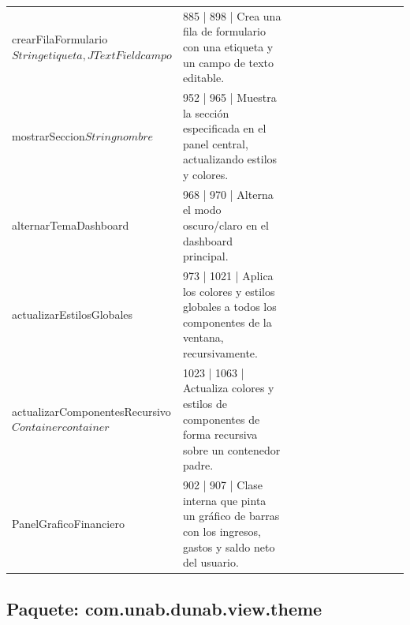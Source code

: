 \documentclass[utf8]{article}
\begin{document}
\begin{longtable}{p{0.18\linewidth}p{0.32\linewidth}p{0.5\linewidth}}
crearFilaFormulario\(String etiqueta, JTextField campo\) & 885 | 898 | Crea una fila de formulario con una etiqueta y un campo de texto editable. \\
mostrarSeccion\(String nombre\) & 952 | 965 | Muestra la sección especificada en el panel central, actualizando estilos y colores. \\
alternarTemaDashboard\(\) & 968 | 970 | Alterna el modo oscuro/claro en el dashboard principal. \\
actualizarEstilosGlobales\(\) & 973 | 1021 | Aplica los colores y estilos globales a todos los componentes de la ventana, recursivamente. \\
actualizarComponentesRecursivo\(Container container\) & 1023 | 1063 | Actualiza colores y estilos de componentes de forma recursiva sobre un contenedor padre. \\
PanelGraficoFinanciero\(\) & 902 | 907 | Clase interna que pinta un gráfico de barras con los ingresos, gastos y saldo neto del usuario. \\
\end{longtable}

\subsection*{Paquete: com.unab.dunab.view.theme}
\end{document}
